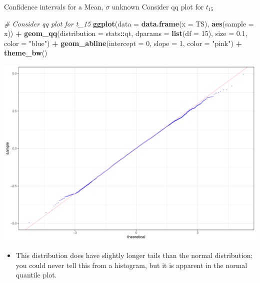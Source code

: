 \documentclass[
  ignorenonframetext,
]{beamer}
\newenvironment{Shaded}{\begin{snugshade}}{\end{snugshade}}
\newcommand{\AttributeTok}[1]{\textcolor[rgb]{0.13,0.29,0.53}{#1}}
\newcommand{\CommentTok}[1]{\textcolor[rgb]{0.56,0.35,0.01}{\textit{#1}}}
\newcommand{\DecValTok}[1]{\textcolor[rgb]{0.00,0.00,0.81}{#1}}
\newcommand{\FloatTok}[1]{\textcolor[rgb]{0.00,0.00,0.81}{#1}}
\newcommand{\FunctionTok}[1]{\textcolor[rgb]{0.13,0.29,0.53}{\textbf{#1}}}
\newcommand{\NormalTok}[1]{#1}
\newcommand{\SpecialCharTok}[1]{\textcolor[rgb]{0.81,0.36,0.00}{\textbf{#1}}}
\newcommand{\StringTok}[1]{\textcolor[rgb]{0.31,0.60,0.02}{#1}}
\providecommand{\tightlist}{%
  \setlength{\itemsep}{0pt}\setlength{\parskip}{0pt}}
\begin{document}
\begin{frame}[fragile]{Confidence intervals for a Mean, \(\sigma\)
unknown}
\protect\hypertarget{confidence-intervals-for-a-mean-sigma-unknown-2}{}
Consider qq plot for \(t_{15}\)

\tiny

\begin{Shaded}
\begin{Highlighting}[]
\CommentTok{\# Consider qq plot for t\_15}
\FunctionTok{ggplot}\NormalTok{(}\AttributeTok{data =} \FunctionTok{data.frame}\NormalTok{(}\AttributeTok{x =}\NormalTok{ TS), }\FunctionTok{aes}\NormalTok{(}\AttributeTok{sample =}\NormalTok{ x)) }\SpecialCharTok{+} 
  \FunctionTok{geom\_qq}\NormalTok{(}\AttributeTok{distribution =}\NormalTok{ stats}\SpecialCharTok{::}\NormalTok{qt, }\AttributeTok{dparams =} \FunctionTok{list}\NormalTok{(}\AttributeTok{df =} \DecValTok{15}\NormalTok{), }\AttributeTok{size =} \FloatTok{0.1}\NormalTok{, }\AttributeTok{color =} \StringTok{"blue"}\NormalTok{) }\SpecialCharTok{+} 
  \FunctionTok{geom\_abline}\NormalTok{(}\AttributeTok{intercept =} \DecValTok{0}\NormalTok{, }\AttributeTok{slope =} \DecValTok{1}\NormalTok{, }\AttributeTok{color =} \StringTok{"pink"}\NormalTok{) }\SpecialCharTok{+} 
  \FunctionTok{theme\_bw}\NormalTok{()}
\end{Highlighting}
\end{Shaded}

\begin{center}\includegraphics[width=0.6\linewidth,height=0.4\textheight]{Week10_Lect_files/figure-beamer/unnamed-chunk-55-1} \end{center}
\normalsize

\begin{itemize}
\tightlist
\item
  This distribution does have slightly longer tails than the normal
  distribution; you could never tell this from a histogram, but it is
  apparent in the normal quantile plot.
\end{itemize}
\end{frame}
\end{document}
